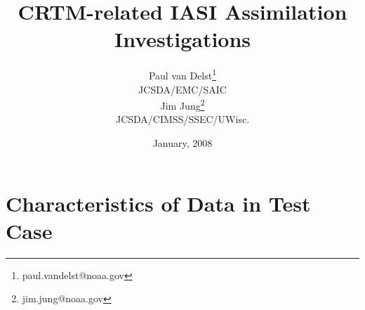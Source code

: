 


\title{CRTM-related IASI Assimilation Investigations}
\author{Paul van Delst\footnote{paul.vandelst@noaa.gov}\\JCSDA/EMC/SAIC\\[0.25in]
        Jim Jung\footnote{jim.jung@noaa.gov}\\JCSDA/CIMSS/SSEC/UWisc.}
\date{January, 2008}




\maketitle


\section{Characteristics of Data in Test Case}
